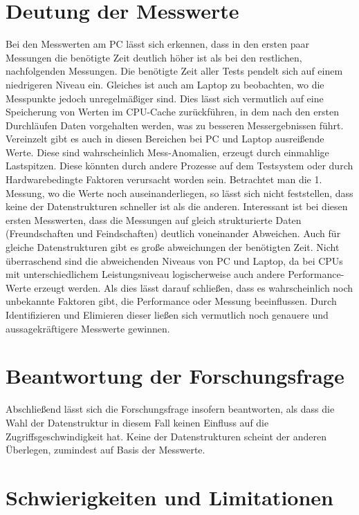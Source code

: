 \documentclass[11pt,a4paper]{article}
\begin{document}
\section{Deutung der Messwerte}

Bei den Messwerten am PC lässt sich erkennen, dass in den ersten paar Messungen die
benötigte Zeit deutlich höher ist als bei den restlichen, nachfolgenden Messungen.
Die benötigte Zeit aller Tests pendelt sich auf einem niedrigeren Niveau ein.
Gleiches ist auch am Laptop zu beobachten, wo die Messpunkte jedoch unregelmäßiger sind.
Dies lässt sich vermutlich auf eine Speicherung von Werten im CPU-Cache zurückführen,
in dem nach den ersten Durchläufen Daten vorgehalten werden, was zu besseren
Messergebnissen führt.
Vereinzelt gibt es auch in diesen Bereichen bei PC und Laptop ausreißende Werte.
Diese sind wahrscheinlich Mess-Anomalien, erzeugt durch einmahlige Lastspitzen.
Diese könnten durch andere Prozesse auf dem Testsystem oder durch Hardwarebedingte 
Faktoren verursacht worden sein.
Betrachtet man die 1. Messung, wo die Werte noch auseinanderliegen,
so lässt sich nicht feststellen, dass keine der Datenstrukturen schneller
ist als die anderen. Interessant ist bei diesen ersten Messwerten, dass die Messungen
auf gleich strukturierte Daten (Freundschaften und Feindschaften) deutlich voneinander
Abweichen. Auch für gleiche Datenstrukturen gibt es große abweichungen der
benötigten Zeit.
Nicht überraschend sind die abweichenden Niveaus von PC und Laptop,
da bei CPUs mit unterschiedlichem Leistungsniveau logischerweise auch andere
Performance-Werte erzeugt werden.
Als dies lässt darauf schließen, dass es wahrscheinlich noch
unbekannte Faktoren gibt, die Performance oder Messung beeinflussen.
Durch Identifizieren und Elimieren dieser ließen sich vermutlich noch
genauere und aussagekräftigere Messwerte gewinnen.

\section{Beantwortung der Forschungsfrage}

Abschließend lässt sich die Forschungsfrage insofern beantworten, als dass
die Wahl der Datenstruktur in diesem Fall keinen Einfluss auf die Zugriffsgeschwindigkeit
hat. Keine der Datenstrukturen scheint der anderen Überlegen, zumindest auf Basis
der Messwerte.

\section{Schwierigkeiten und Limitationen}
\end{document}
